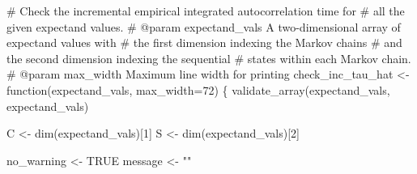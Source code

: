 \documentclass[
  letterpaper,
  DIV=11,
  numbers=noendperiod]{scrartcl}
\newenvironment{Shaded}{\begin{snugshade}}{\end{snugshade}}
\newcommand{\CommentTok}[1]{\textcolor[rgb]{0.37,0.37,0.37}{#1}}
\newcommand{\DecValTok}[1]{\textcolor[rgb]{0.68,0.00,0.00}{#1}}
\newcommand{\NormalTok}[1]{\textcolor[rgb]{0.00,0.23,0.31}{#1}}
\newcommand{\OperatorTok}[1]{\textcolor[rgb]{0.37,0.37,0.37}{#1}}
\newcommand{\StringTok}[1]{\textcolor[rgb]{0.13,0.47,0.30}{#1}}
\begin{document}
\begin{Shaded}
\begin{Highlighting}[]
\CommentTok{\# Check the incremental empirical integrated autocorrelation time for}
\CommentTok{\# all the given expectand values.}
\CommentTok{\# @param expectand\_vals A two{-}dimensional array of expectand values with}
\CommentTok{\#                       the first dimension indexing the Markov chains}
\CommentTok{\#                       and the second dimension indexing the sequential}
\CommentTok{\#                       states within each Markov chain.}
\CommentTok{\# @param max\_width Maximum line width for printing}
\NormalTok{check\_inc\_tau\_hat }\OperatorTok{\textless{}{-}}\NormalTok{ function(expectand\_vals,}
\NormalTok{                              max\_width}\OperatorTok{=}\DecValTok{72}\NormalTok{) \{}
\NormalTok{  validate\_array(expectand\_vals, }\StringTok{\textquotesingle{}expectand\_vals\textquotesingle{}}\NormalTok{)}

\NormalTok{  C }\OperatorTok{\textless{}{-}}\NormalTok{ dim(expectand\_vals)[}\DecValTok{1}\NormalTok{]}
\NormalTok{  S }\OperatorTok{\textless{}{-}}\NormalTok{ dim(expectand\_vals)[}\DecValTok{2}\NormalTok{]}

\NormalTok{  no\_warning }\OperatorTok{\textless{}{-}}\NormalTok{ TRUE}
\NormalTok{  message }\OperatorTok{\textless{}{-}} \StringTok{""}


\end{Highlighting}
\end{Shaded}
\end{document}
